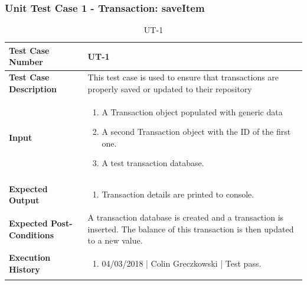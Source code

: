 \documentclass[12pt]{article}
\begin{document}
\subsubsection{Unit Test Case 1 - Transaction: saveItem}
\def\arraystretch{1.5}%
\begin{table}[htbp]
\centering
\caption {UT-1}
\label{UT-1}
\begin{tabularx}{\textwidth}{ | l | X |}
\hline
\textbf{Test Case Number}      &  UT-1                         \\ \hline
\textbf{Test Case Description}    &  This test case is used to ensure that transactions are properly saved or updated to their repository                \\ \hline
\textbf{Input}         & 	\begin{enumerate}
	\item A Transaction object populated with generic data
          \item A second Transaction object with the ID of the first one.
	\item A test transaction database.
\end{enumerate} \\ \hline

\textbf{Expected Output}     & \begin{enumerate}
	\item Transaction details are printed to console.
\end{enumerate} \\ \hline
\textbf{Expected Post-Conditions}           &  A transaction database is created and a transaction is inserted. The balance of this transaction is then updated to a new value.                   \\ \hline
\textbf{Execution History}   &  \begin{enumerate}
	\item 04/03/2018 | Colin Greczkowski | Test pass.
\end {enumerate} \\ \hline
\end{tabularx}
\end{table}
\clearpage

\end{document}

